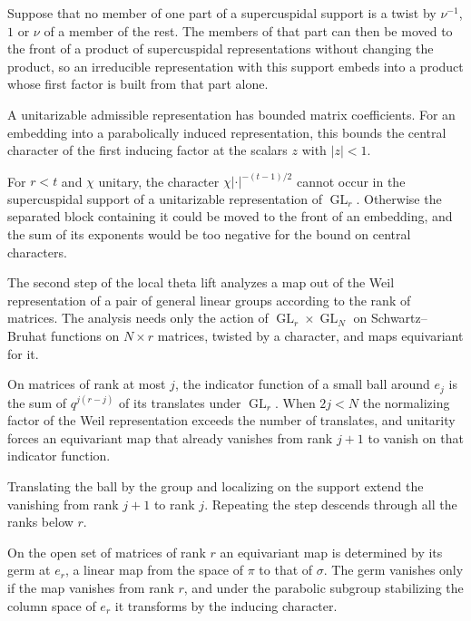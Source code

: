 Suppose that no member of one part of a supercuspidal support is a twist by $\nu^{-1}$, $1$ or $\nu$ of a
member of the rest. The members of that part can then be moved to the front of a product of supercuspidal representations without
changing the product, so an irreducible representation with this support embeds into a product whose first
factor is built from that part alone.

A unitarizable admissible representation has bounded matrix coefficients. For an embedding into a
parabolically induced representation, this bounds the central character of the first inducing factor at
the scalars $z$ with $|z|<1$.

For $r<t$ and $\chi$ unitary, the character $\chi|\cdot|^{-(t-1)/2}$ cannot occur in the supercuspidal
support of a unitarizable representation of $\operatorname{GL}_r$. Otherwise the separated block containing
it could be moved to the front of an embedding, and the sum of its exponents would be too negative for the
bound on central characters.

The second step of the local theta lift analyzes a map out of the Weil representation of a pair of general
linear groups according to the rank of matrices. The analysis needs only the action of
$\operatorname{GL}_r\times\operatorname{GL}_N$ on Schwartz--Bruhat functions on $N\times r$ matrices,
twisted by a character, and maps equivariant for it.

On matrices of rank at most $j$, the indicator function of a small ball around $e_j$ is the sum of
$q^{j(r-j)}$ of its translates under $\operatorname{GL}_r$. When $2j<N$ the normalizing factor of the Weil
representation exceeds the number of translates, and unitarity forces an equivariant map that already
vanishes from rank $j+1$ to vanish on that indicator function.

Translating the ball by the group and localizing on the support extend the vanishing from rank $j+1$ to rank
$j$. Repeating the step descends through all the ranks below $r$.

On the open set of matrices of rank $r$ an equivariant map is determined by its germ at $e_r$, a linear map
from the space of $\pi$ to that of $\sigma$. The germ vanishes only if the map vanishes from rank $r$, and under the parabolic
subgroup stabilizing the column space of $e_r$ it transforms by the inducing character.

